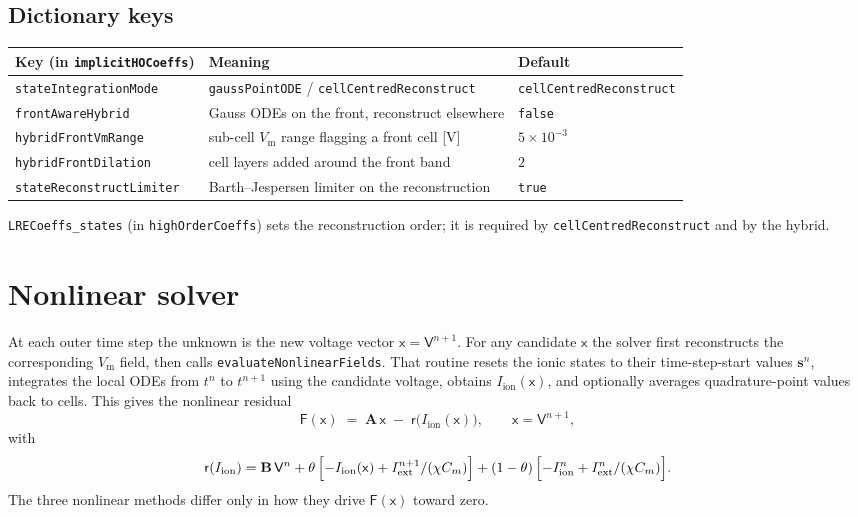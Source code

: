 \documentclass[11pt,a4paper]{article}
\newcommand{\code}[1]{\texttt{\small #1}}
\newcommand{\Vm}{V_{\text{m}}}
\newcommand{\Iion}{I_{\mathrm{ion}}}
\newcommand{\Aimp}{\mathbf{A}}
\newcommand{\Bimp}{\mathbf{B}}
\newcommand{\Fres}{\mathsf{F}}
\newcommand{\Iext}{I_{\mathrm{ext}}}
\begin{document}
\subsection{Dictionary keys}

\begin{center}
\begin{tabular}{@{}lll@{}}
\toprule
Key (in \code{implicitHOCoeffs}) & Meaning & Default \\
\midrule
\code{stateIntegrationMode} & \code{gaussPointODE} / \code{cellCentredReconstruct} & \code{cellCentredReconstruct} \\
\code{frontAwareHybrid} & Gauss ODEs on the front, reconstruct elsewhere & \code{false} \\
\code{hybridFrontVmRange} & sub-cell $\Vm$ range flagging a front cell [V] & $5\times10^{-3}$ \\
\code{hybridFrontDilation} & cell layers added around the front band & $2$ \\
\code{stateReconstructLimiter} & Barth--Jespersen limiter on the reconstruction & \code{true} \\
\bottomrule
\end{tabular}
\end{center}
\code{LRECoeffs\_states} (in \code{highOrderCoeffs}) sets the reconstruction
order; it is required by \code{cellCentredReconstruct} and by the hybrid.

\section{Nonlinear solver}

At each outer time step the unknown is the new voltage vector
$\mathsf{x}=\mathsf{V}^{n+1}$. For any candidate $\mathsf{x}$ the solver
first reconstructs the corresponding $\Vm$ field, then calls
\code{evaluateNonlinearFields}. That routine resets the ionic states to
their time-step-start values $\mathbf{s}^{n}$, integrates the local ODEs
from $t^n$ to $t^{n+1}$ using the candidate voltage, obtains
$\Iion(\mathsf{x})$, and optionally averages quadrature-point values
back to cells. This gives the nonlinear residual
\begin{equation}
  \Fres(\mathsf{x})
   \;=\;
   \Aimp\, \mathsf{x}
   \;-\;
   \mathsf{r}\!\bigl( \Iion(\mathsf{x}) \bigr),
   \qquad
   \mathsf{x} = \mathsf{V}^{n+1},
   \label{eq:Fdef}
\end{equation}
with
\begin{equation}
  \mathsf{r}(\Iion)
  =
  \Bimp\,\mathsf{V}^{n}
  + \theta\,\Bigl[-\Iion(\mathsf{x})+\Iext^{n+1}/(\chi C_m)\Bigr]
  + (1-\theta)\,\Bigl[-\Iion^{n}+\Iext^{n}/(\chi C_m)\Bigr].
  \label{eq:rhsIion}
\end{equation}
The three nonlinear methods differ only in how they drive
$\Fres(\mathsf{x})$ toward zero.
\end{document}
